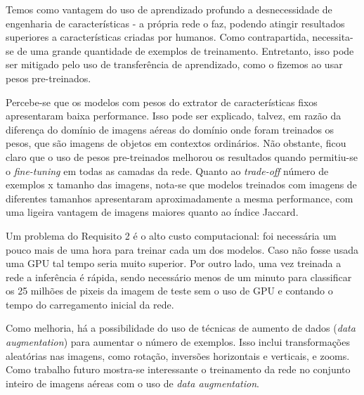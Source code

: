 \documentclass{bmvc2k}
\begin{document}
Temos como vantagem do uso de aprendizado profundo a desnecessidade de engenharia de características - a própria rede o faz, podendo atingir resultados superiores a características criadas por humanos. Como contrapartida, necessita-se de uma grande quantidade de exemplos de treinamento. Entretanto, isso pode ser mitigado pelo uso de transferência de aprendizado, como o fizemos ao usar pesos pre-treinados.

Percebe-se que os modelos com pesos do extrator de características fixos apresentaram baixa performance. Isso pode ser explicado, talvez, em razão da diferença do domínio de imagens aéreas do domínio onde foram treinados os pesos, que são imagens de objetos em contextos ordinários. Não obstante, ficou claro que o uso de pesos pre-treinados melhorou os resultados quando permitiu-se o \textit{fine-tuning} em todas as camadas da rede. Quanto ao \textit{trade-off} número de exemplos x tamanho das imagens, nota-se que modelos treinados com imagens de diferentes tamanhos apresentaram aproximadamente a mesma performance, com uma ligeira vantagem de imagens maiores quanto ao índice Jaccard.

Um problema do Requisito 2 é o alto custo computacional: foi necessária um pouco mais de uma hora para treinar cada um dos modelos. Caso não fosse usada uma GPU tal tempo seria muito superior. Por outro lado, uma vez treinada a rede a inferência é rápida, sendo necessário menos de um minuto para classificar os 25 milhões de pixeis da imagem de teste sem o uso de GPU e contando o tempo do carregamento inicial da rede.

Como melhoria, há a possibilidade do uso de técnicas de aumento de dados (\textit{data augmentation}) para aumentar o número de exemplos. Isso inclui transformações aleatórias nas imagens, como rotação, inversões horizontais e verticais, e zooms. Como trabalho futuro mostra-se interessante o treinamento da rede no conjunto inteiro de imagens aéreas com o uso de \textit{data augmentation}.

\clearpage

\end{document}
